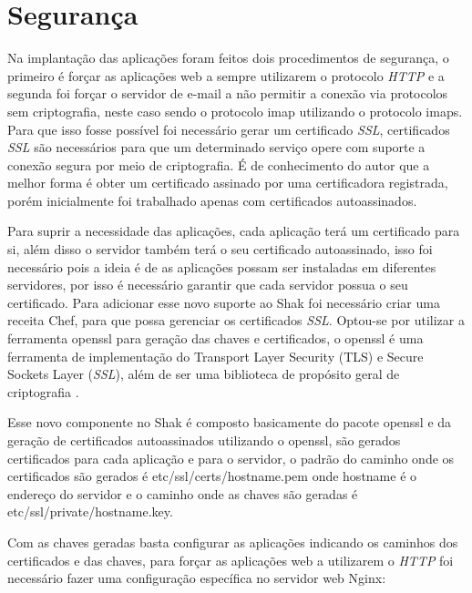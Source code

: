 \section{Segurança}
\label{sub:seguranca}

Na implantação das aplicações foram feitos dois procedimentos de segurança, o primeiro
é forçar as aplicações web a sempre utilizarem o protocolo \textit{HTTP} e a segunda foi forçar o
servidor de e-mail a não permitir a conexão via protocolos sem criptografia, neste
caso sendo o protocolo imap utilizando o protocolo imaps. Para que isso fosse possível
foi necessário gerar um certificado \textit{SSL}, certificados \textit{SSL} são necessários para
que um determinado serviço opere com suporte a conexão segura por meio de criptografia.
É de conhecimento do autor que a melhor forma é obter um certificado assinado
por uma certificadora registrada, porém inicialmente foi trabalhado apenas com certificados
autoassinados.

Para suprir a necessidade das aplicações, cada aplicação terá um certificado para
si, além disso o servidor também terá o seu certificado autoassinado, isso foi necessário
pois a ideia é de as aplicações possam ser instaladas em diferentes servidores, por
isso é necessário garantir que cada servidor possua o seu certificado. Para adicionar
esse novo suporte ao Shak foi necessário criar uma receita Chef,
para que possa gerenciar os certificados \textit{SSL}. Optou-se por utilizar a ferramenta
openssl para geração das chaves e certificados, o openssl é uma ferramenta de
implementação do Transport Layer Security (TLS) e Secure Sockets Layer (\textit{SSL}),
além de ser uma biblioteca de propósito geral de criptografia \cite{openssl}.

Esse novo componente no Shak é composto basicamente do pacote openssl e da geração
de certificados autoassinados utilizando o openssl, são gerados certificados
para cada aplicação e para o servidor, o padrão do caminho onde os certificados são
gerados é etc/ssl/certs/hostname.pem onde hostname é o endereço do servidor
e o caminho onde as chaves são geradas é etc/ssl/private/hostname.key.

Com as chaves geradas basta configurar as aplicações indicando os caminhos dos certificados
e das chaves, para forçar as aplicações web a utilizarem o \textit{HTTP} foi necessário fazer
uma configuração específica no servidor web Nginx:


